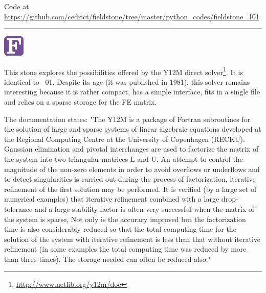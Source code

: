 

\begin{center}
Code at \url{https://github.com/cedrict/fieldstone/tree/master/python_codes/fieldstone_101}
\end{center}

\par\noindent\rule{\textwidth}{0.4pt}


\begin{center}
\includegraphics[width=1cm]{images/fortran/fortran} 
\end{center}

This stone explores the possibilities offered by the Y12M direct solver\footnote{
\url{http://www.netlib.org/y12m/doc}}. It is identical 
to \stone~01. Despite its age (it was published in 1981), 
this solver remains interesting because it is rather compact, has a simple interface, fits in 
a single file and relies on a sparse storage for the FE matrix.

The documentation \cite{zlws81} states:
"The Y12M is a package of Fortran subroutines for the solution of large and sparse systems of
linear algebraic equations developed at the Regional Computing Centre at the University of
Copenhagen (RECKU). Gaussian elimination and pivotal interchanges are used to factorize
the matrix of the system into two triangular matrices L and U. An attempt to control the
magnitude of the non-zero elements in order to avoid overflows or underflows and to detect
singularities is carried out during the process of factorization, lterative refinement of the first
solution may be performed. It is verified (by a large set of numerical examples) that iterative
refinement combined with a large drop-tolerance and a large stability factor is often very
successful when the matrix of the system is sparse, Not only is the accuracy improved but
the factorization time is also considerably reduced so that the total computing time for the
solution of the system with iterative refinement is less than that without iterative refinement
(in some examples the total computing time was reduced by more than three times). The
storage needed can often be reduced also."

